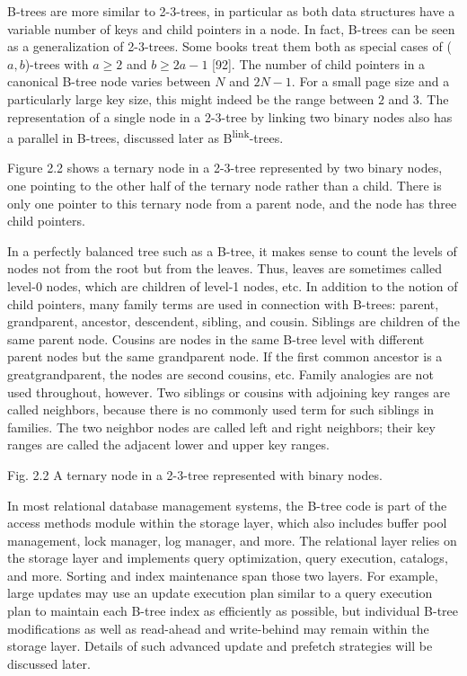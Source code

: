 B-trees are more similar to 2-3-trees, in particular as both data
structures have a variable number of keys and child pointers in a node.
In fact, B-trees can be seen as a generalization of 2-3-trees. Some
books treat them both as special cases of ($a,b$)-trees with
$a \geq 2$ and $b \geq 2a − 1$ {[}92{]}. The number of child
pointers in a canonical B-tree node varies between $N$ and
$2N − 1$. For a small page size and a particularly large key size,
this might indeed be the range between $2$ and $3$. The representation of a
single node in a 2-3-tree by linking two binary nodes also has a
parallel in B-trees, discussed later as B\textsuperscript{link}-trees.

Figure 2.2 shows a ternary node in a 2-3-tree represented by two binary
nodes, one pointing to the other half of the ternary node rather than a
child. There is only one pointer to this ternary node from a parent
node, and the node has three child pointers.

In a perfectly balanced tree such as a B-tree, it makes sense to count
the levels of nodes not from the root but from the leaves. Thus, leaves
are sometimes called level-0 nodes, which are children of level-1 nodes,
etc. In addition to the notion of child pointers, many family terms are
used in connection with B-trees: parent, grandparent, ancestor,
descendent, sibling, and cousin. Siblings are children of the same
parent node. Cousins are nodes in the same B-tree level with different
parent nodes but the same grandparent node. If the first common ancestor
is a greatgrandparent, the nodes are second cousins, etc. Family
analogies are not used throughout, however. Two siblings or cousins with
adjoining key ranges are called neighbors, because there is no commonly
used term for such siblings in families. The two neighbor nodes are
called left and right neighbors; their key ranges are called the
adjacent lower and upper key ranges.

Fig. 2.2 A ternary node in a 2-3-tree represented with binary nodes.

In most relational database management systems, the B-tree code is part
of the access methods module within the storage layer, which also
includes buffer pool management, lock manager, log manager, and more.
The relational layer relies on the storage layer and implements query
optimization, query execution, catalogs, and more. Sorting and index
maintenance span those two layers. For example, large updates may use an
update execution plan similar to a query execution plan to maintain each
B-tree index as efficiently as possible, but individual B-tree
modifications as well as read-ahead and write-behind may remain within
the storage layer. Details of such advanced update and prefetch
strategies will be discussed later.


